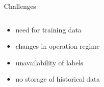 \documentclass[aspectratio=169]{beamer}
\begin{document}
\begin{frame}{Challenges}

    \begin{columns}
        \begin{column}{0.62\textwidth}
            \begin{itemize}[<+->]
                \item need for training data
                \item changes in operation regime
                \item unavailability of labels
                \item no storage of historical data
            \end{itemize}
        \end{column}
        \begin{column}{0.38\textwidth}
\end{column}
\end{columns}
\end{frame}
\end{document}
